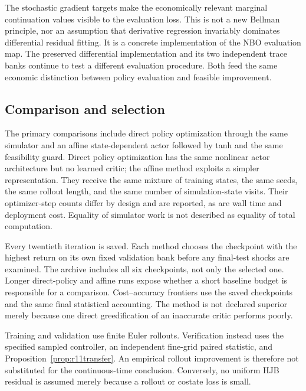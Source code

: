 The stochastic gradient targets make the economically relevant marginal continuation values visible to the evaluation loss. This is not a new Bellman principle, nor an assumption that derivative regression invariably dominates differential residual fitting. It is a concrete implementation of the NBO evaluation map. The preserved differential implementation and its two independent trace banks continue to test a different evaluation procedure. Both feed the same economic distinction between policy evaluation and feasible improvement.

\subsection{Comparison and selection}
The primary comparisons include direct policy optimization through the same simulator and an affine state-dependent actor followed by tanh and the same feasibility guard. Direct policy optimization has the same nonlinear actor architecture but no learned critic; the affine method exploits a simpler representation. They receive the same mixture of training states, the same seeds, the same rollout length, and the same number of simulation-state visits. Their optimizer-step counts differ by design and are reported, as are wall time and deployment cost. Equality of simulator work is not described as equality of total computation.

Every twentieth iteration is saved. Each method chooses the checkpoint with the highest return on its own fixed validation bank before any final-test shocks are examined. The archive includes all six checkpoints, not only the selected one. Longer direct-policy and affine runs expose whether a short baseline budget is responsible for a comparison. Cost--accuracy frontiers use the saved checkpoints and the same final statistical accounting. The method is not declared superior merely because one direct greedification of an inaccurate critic performs poorly.

Training and validation use finite Euler rollouts. Verification instead uses the specified sampled controller, an independent fine-grid paired statistic, and Proposition~\ref{prop:r11transfer}. An empirical rollout improvement is therefore not substituted for the continuous-time conclusion. Conversely, no uniform HJB residual is assumed merely because a rollout or costate loss is small.
